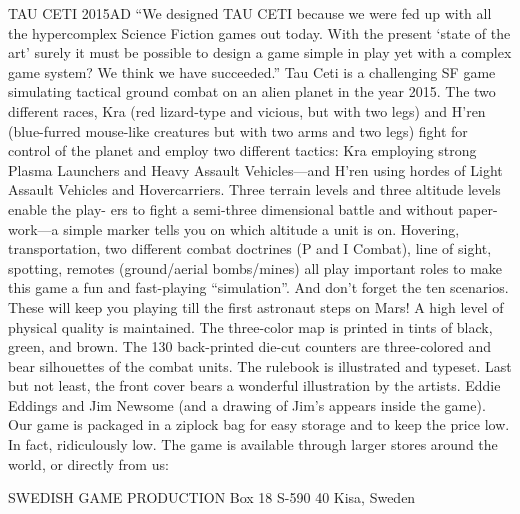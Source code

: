 TAU CETI 2015AD
“We designed TAU CETI because we were fed up
with all the hypercomplex Science Fiction games
out today. With the present ‘state of the art’
surely it must be possible to design a game
simple in play yet with a complex game system?
We think we have succeeded.”
Tau Ceti is a challenging SF game simulating tactical ground
combat on an alien planet in the year 2015. The two different
races, Kra (red lizard-type and vicious, but with two legs) and
H’ren (blue-furred mouse-like creatures but with two arms
and two legs) fight for control of the planet and employ two
different tactics: Kra employing strong Plasma Launchers
and Heavy Assault Vehicles—and H’ren using hordes of Light
Assault Vehicles and Hovercarriers.
Three terrain levels and three altitude levels enable the play-
ers to fight a semi-three dimensional battle and without paper-
work—a simple marker tells you on which altitude a unit is on.
Hovering, transportation, two different combat doctrines (P
and I Combat), line of sight, spotting, remotes (ground/aerial
bombs/mines) all play important roles to make this game a fun
and fast-playing “simulation”. And don’t forget the ten
scenarios. These will keep you playing till the first astronaut
steps on Mars!
A high level of physical quality is maintained. The three-color
map is printed in tints of black, green, and brown. The 130
back-printed die-cut counters are three-colored and bear
silhouettes of the combat units. The rulebook is illustrated and
typeset. Last but not least, the front cover bears a wonderful
illustration by the artists. Eddie Eddings and Jim Newsome
(and a drawing of Jim’s appears inside the game). Our game
is packaged in a ziplock bag for easy storage and to keep the
price low. In fact, ridiculously low.
The game is available through larger stores around the world,
or directly from us:

SWEDISH GAME PRODUCTION
Box 18
S-590 40 Kisa, Sweden

